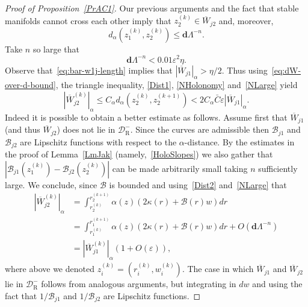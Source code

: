 \documentclass[AHL, Unicode, longabstracts,published]{cedram}
\newcommand{\eps}{\varepsilon}
\newcommand{\ct}{r}
\newcommand{\bd}{\mathbf{d}}
\newcommand{\cB}{\mathcal{B}}
\newcommand{\pslope}{\mathcal{B}}
\newcommand{\cell}{\mathcal{D}}
\newcommand{\brW}{\overline{W}}
\newcommand{\recoPrivate}{\mathrm{R}}
\newcommand{\reco}{{\cell^-_{\recoPrivate}}}
\newcommand{\dadm}[1]{\dadmPrivate^{#1}}
\newcommand{\dadmPrivate}{d\adm}
\newcommand{\ppPrivate}[2]{#1^{#2}}
\newcommand{\prePrivate}[1]{\ppPrivate{#1}{-}}
\newcommand{\prpslope}{\prePrivate{\pslope}}
\newcommand{\adm}{_{\alpha^{+}}}
\newcommand{\admName}{\alpha^{+}}
\renewcommand{\admName}{\alpha}
\renewcommand{\adm}{_{\alpha}}
\renewcommand{\prpslope}{\cB}
\renewcommand{\prpslope}{\cB}
\renewcommand{\prpslope}{\cB}
\renewcommand{\dadm}{d\adm}
\begin{document}
\begin{proof}[Proof of Proposition~\ref{PrAC1}]
Our previous arguments and the fact that stable manifolds cannot cross each other imply that $z_{2}^{(k)}\in\brW_{j2}$ and, moreover,
\begin{equation}\label{NHolonomy}
\dadm\left(z_{1}^{(k)},z_{2}^{(k)}\right) \le \bd\Lambda^{-n}.
\end{equation}
Take $n$ so large that
\begin{equation}\label{NLarge}
\bd\Lambda^{-n}<0.01\eps^2 \eta.
\end{equation}
Observe that~\eqref{eq:bar-w1j-length} implies that $|\brW_{j1}|\adm > \eta/2$. Thus using~\eqref{eq:dW-over-d-bound}, the triangle inequality, \eqref{Dist1}, \eqref{NHolonomy} and~\eqref{NLarge} yield
\begin{equation}\label{Dist2}
\left|\brW_{j2}^{(k)}\right|\adm
\le C_{\alpha} \dadm\left(z_{2}^{(k)},z_{2}^{(k+1)}\right) < 2 C_{\alpha} \bar C\eps|\brW_{j1}|\adm.
\end{equation}
Indeed it is possible to obtain a better estimate as follows. Assume first that $\brW_{j1}$ (and thus $\brW_{j2}$) does not lie in $\reco$. Since the curves are admissible then $\prpslope_{j1}$ and $\prpslope_{j2}$ are Lipschitz functions with respect to the $\admName$-distance. By the estimates in the proof of Lemma~\ref{LmJak} (namely,~\eqref{HoloSlopes}) we also gather that $|\prpslope_{j1}(z_{1}^{(k)}) - \prpslope_{j2}(z_{2}^{(k)})|$ can be made arbitrarily small taking $n$ sufficiently large. We conclude, since $\prpslope$ is bounded and using~\eqref{Dist2} and~\eqref{NLarge} that
\begin{equation}\label{Dist2_better}
\begin{split}
\left|\brW_{j2}^{(k)}\right|\adm & = 
\int_{\ct_{2}^{(k)}}^{\ct_{2}^{(k+1)}} \alpha(z)(2\kappa(r)+\prpslope(r)w) d\ct \\
& =  {\int_{\ct_{1}^{(k)}}^{\ct_{1}^{(k+1)}}} \alpha(z)(2\kappa(r)+\prpslope(r)w) d\ct+O(\bd \Lambda^{-n})\\
&  =  \left|\brW_{j1}^{(k)}\right|\adm(1+O(\eps)),
\end{split}
\end{equation}
where above we denoted $z_{i}^{(k)} = (r_{i}^{(k)},w_{i}^{(k)})$. The case in which $\brW_{j1}$ and $\brW_{j2}$ lie in $\reco$ follows from analogous arguments, but integrating in $dw$ and using the fact that $1/\prpslope_{j1}$ and $1/\prpslope_{j2}$ are Lipschitz functions.



\end{proof}
\end{document}
